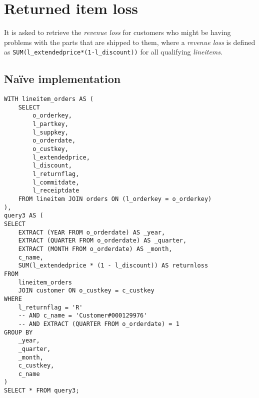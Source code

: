

\section{Returned item loss}

It is asked to retrieve the \textit{revenue loss} for customers who might be having problems with the parts that are shipped to them, where a \textit{revenue loss} is defined as \texttt{SUM(l\_extendedprice*(1-l\_discount))} for all qualifying \textit{lineitems}.

\subsection{Na\"{i}ve implementation}

\begin{lstlisting}
WITH lineitem_orders AS (
	SELECT 
		o_orderkey, 
		l_partkey, 
		l_suppkey, 
		o_orderdate, 
		o_custkey, 
		l_extendedprice, 
		l_discount, 
		l_returnflag,
		l_commitdate,
		l_receiptdate
	FROM lineitem JOIN orders ON (l_orderkey = o_orderkey)
),
query3 AS (
SELECT
	EXTRACT (YEAR FROM o_orderdate) AS _year,
	EXTRACT (QUARTER FROM o_orderdate) AS _quarter,
	EXTRACT (MONTH FROM o_orderdate) AS _month,
	c_name,
	SUM(l_extendedprice * (1 - l_discount)) AS returnloss
FROM
	lineitem_orders
	JOIN customer ON o_custkey = c_custkey
WHERE 
	l_returnflag = 'R'
	-- AND c_name = 'Customer#000129976'
	-- AND EXTRACT (QUARTER FROM o_orderdate) = 1
GROUP BY
	_year,
	_quarter,
	_month,
	c_custkey,
	c_name
)
SELECT * FROM query3;
\end{lstlisting}

